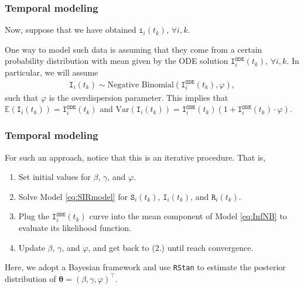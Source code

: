 \documentclass[12pt, aspectratio = 169]{beamer} %
\begin{document}
	
	\begin{frame}[t]
		\frametitle{Temporal modeling}
		\justifying
		
		Now, suppose that we have obtained $\texttt{i}_i(t_k)$, $\forall i, k$.
		
		One way to model such data is assuming that they come from a certain probability distribution with mean given by the ODE solution $\texttt{I}_i^{\texttt{ODE}}(t_k)$, $\forall i, k$. In particular, we will assume
		\begin{align} \label{eq:InfNB}
			\texttt{I}_i(t_k) \sim \text{Negative Binomial}(\texttt{I}_{i}^{\texttt{ODE}}(t_k), \varphi),
		\end{align}
		such that $\varphi$ is the overdispersion parameter. This implies that $\mathbb{E}(\texttt{I}_i(t_k)) = \texttt{I}_{i}^{\texttt{ODE}}(t_k)$ and $\text{Var}(\texttt{I}_i(t_k)) = \texttt{I}_{i}^{\texttt{ODE}}(t_k)(1 + \texttt{I}_{i}^{\texttt{ODE}}(t_k) \cdot \varphi)$.
		
	\end{frame}
	
	\begin{frame}[t]
		\frametitle{Temporal modeling}
		\justifying
		
		For such an approach, notice that this is an iterative procedure. That is, 
		
		\begin{enumerate}
			\justifying
			\item Set initial values for $\beta$, $\gamma$, and $\varphi$.
			\item Solve Model \eqref{eq:SIRmodel} for $\texttt{S}_i(t_k)$, $\texttt{I}_i(t_k)$, and $\texttt{R}_i(t_k)$.
			\item Plug the $\texttt{I}_i^{\texttt{ODE}}(t_k)$ curve into the mean component of Model \eqref{eq:InfNB} to evaluate its likelihood function.
			\item Update $\beta$, $\gamma$, and $\varphi$, and get back to (2.) until reach convergence.
		\end{enumerate}
		
		Here, we adopt a Bayesian framework and use \texttt{RStan} \citep{rstanpackage} to estimate the posterior distribution of $\boldsymbol{\theta} = (\beta, \gamma, \varphi)^{\top}$.
		
	\end{frame}
	
\end{document}

